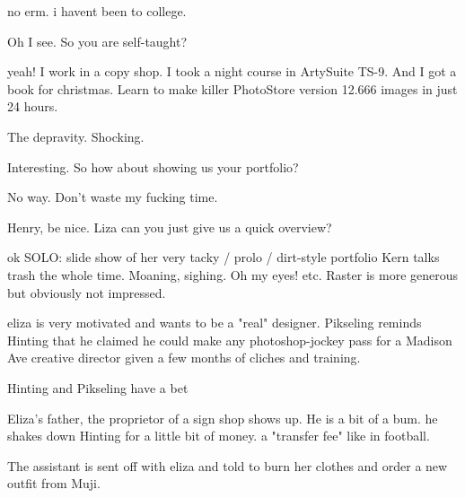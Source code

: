 \Liza no erm.  i havent been to college.

\Raster Oh I see.  So you are self-taught?

\Liza yeah!  I work in a copy shop.  I took a night course in ArtySuite TS-9. And I got a book for christmas.  Learn to make killer PhotoStore version 12.666 images in just 24 hours. 

\Kern The depravity.  Shocking.

\Raster Interesting.  So how about showing us your portfolio?

\Kern No way.  Don't waste my fucking time.

\Raster Henry, be nice.  Liza can you just give us a quick overview?

\Liza ok
SOLO: slide show of her very tacky / prolo / dirt-style portfolio 
Kern talks trash the whole time.  Moaning, sighing.  Oh my eyes! etc.
Raster is more generous but obviously not impressed.


eliza is very motivated and wants to be a "real" designer.  Pikseling reminds Hinting that he claimed he could make any photoshop-jockey pass for a Madison Ave creative director given a few months of cliches and training.

Hinting and Pikseling have a bet

Eliza's father, the proprietor of a sign shop shows up.  He is a bit of a bum.  he shakes down Hinting for a little bit of money. a "transfer fee" like in football.

The assistant is sent off with eliza and told to burn her clothes and order a new outfit from Muji.
